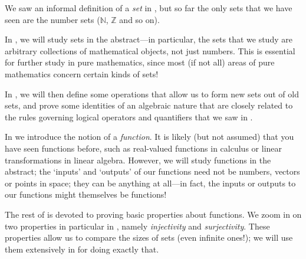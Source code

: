 We saw an informal definition of a \textit{set} in , but so far the only sets that we have seen are the number sets ($\mathbb{N}$, $\mathbb{Z}$ and so on).

In , we will study sets in the abstract---in particular, the sets that we study are arbitrary collections of mathematical objects, not just numbers. This is essential for further study in pure mathematics, since most (if not all) areas of pure mathematics concern certain kinds of sets!

In , we will then define some operations that allow us to form new sets out of old sets, and prove some identities of an algebraic nature that are closely related to the rules governing logical operators and quantifiers that we saw in .

In  we introduce the notion of a \textit{function}. It is likely (but not assumed) that you have seen functions before, such as real-valued functions in calculus or linear transformations in linear algebra. However, we will study functions in the abstract; the `inputs' and `outputs' of our functions need not be numbers, vectors or points in space; they can be anything at all---in fact, the inputs or outputs to our functions might themselves be functions!

The rest of  is devoted to proving basic properties about functions. We zoom in on two properties in particular in , namely \textit{injectivity} and \textit{surjectivity}. These properties allow us to compare the sizes of sets (even infinite ones!); we will use them extensively in  for doing exactly that.
